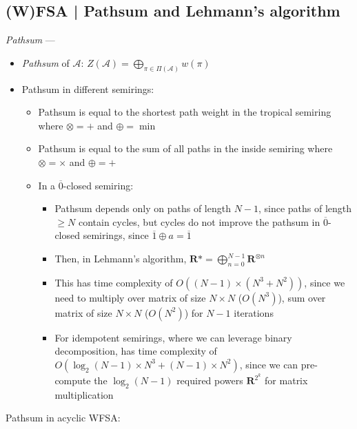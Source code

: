 \subsection*{(W)FSA | Pathsum and Lehmann's algorithm}
\emph{Pathsum} ---
\begin{itemize}
    \item \emph{Pathsum} of $\mathcal{A}$:
    $
    Z(\mathcal{A}) = \bigoplus_{\pi \in \Pi(\mathcal{A})} w(\pi)
    $
    \item Pathsum in different semirings:
    \begin{itemize}
        \item Pathsum is equal to the shortest path weight in the tropical semiring where $\otimes = +$ and $\oplus = \min$
        \item Pathsum is equal to the sum of all paths in the inside semiring where $\otimes = \times$ and $\oplus = +$
        \item In a $\overline{0}$-closed semiring:
        \begin{itemize}
            \item Pathsum depends only on paths of length $N-1$, since paths of length $\geq N$ contain cycles, but cycles do not improve the pathsum in $\overline{0}$-closed semirings, since $\overline{1} \oplus a = \overline{1}$
            \item Then, in Lehmann's algorithm, $\boldsymbol{R}* = \bigoplus_{n=0}^{N-1} \boldsymbol{R}^{\otimes n}$
            \item This has time complexity of $O((N-1) \times (N^3 + N^2))$, since we need to multiply over matrix of size $N \times N$ ($O(N^3)$), sum  over matrix of size $N \times N$ ($O(N^2)$) for $N-1$ iterations
            \item For idempotent semirings, where we can leverage binary decomposition, has time complexity of $O(\log_2(N-1) \times N^3 + (N-1) \times N^2)$, since we can pre-compute the $\log_2(N-1)$ required powers $\boldsymbol{R}^{2^k}$ for matrix multiplication
        \end{itemize}
    \end{itemize}
\end{itemize}
Pathsum in acyclic WFSA:
